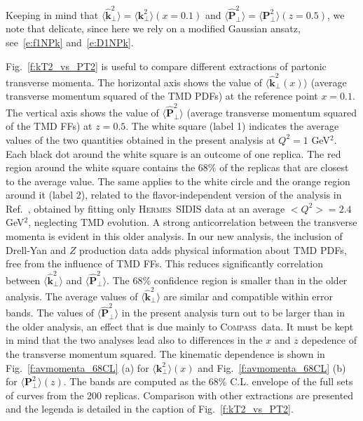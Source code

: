 \documentclass[aps,preprintnumbers,showpacs,nofootinbib,superscriptaddress,floatfix]{revtex4}
\newcommand{\hermes}{\textsc{Hermes}}
\newcommand{\compass}{\textsc{Compass}}
\newcommand{\T}{\perp}
\begin{document}
Keeping in mind that $\big \langle \hat{\bm{k}}_{\T}^2 \big \rangle = \big
\langle \bm{k}_{\T}^2 \big \rangle (x=0.1)$ and  $\big \langle
\hat{\bm{P}}_{\perp}^2 \big \rangle = \big \langle \bm{P}_{\perp}^2 \big
\rangle (z=0.5)$, we note that 
delicate, since here we rely on a modified Gaussian ansatz,
see~\eqref{e:f1NPk} and~\eqref{e:D1NPk}.

Fig.~\ref{f:kT2_vs_PT2} is useful to compare different extractions of
partonic transverse momenta. The horizontal axis shows 
the value of $\big \langle \hat{\bm{k}}_{\T}^2 (x)\big \rangle$ (average transverse
momentum squared of the TMD PDFs) at the reference point 
$x=0.1$. 
The vertical
axis shows the value of $\big \langle
\hat{\bm{P}}_{\perp}^2 \big \rangle$ (average transverse momentum squared of
the TMD FFs) at $z=0.5$. 
The white square (label 1) indicates the average values of the two quantities
obtained in the present analysis at $Q^2=1$ GeV$^2$.
Each black dot around the white square is an outcome of one replica. The red
region around the white square contains the $68\%$ of the replicas that are closest to the average value.
The same applies to the white circle and the orange region around it (label 2),
related to the flavor-independent version of the analysis in
Ref.~\cite{Signori:2013mda}, obtained by fitting only \hermes\ SIDIS
data at an average $<Q^2>= 2.4$ GeV$^2$, neglecting TMD evolution. 
A strong anticorrelation between the transverse momenta is evident in this
older analysis. 
In our new analysis, the inclusion of Drell-Yan and $Z$ production data adds physical information
about TMD PDFs, free from the influence of TMD FFs. This reduces significantly
correlation between $\big \langle \hat{\bm{k}}_{\T}^2 \big \rangle$ and $\big \langle \hat{\bm{P}}_{\perp}^2 \big \rangle$.  
The 68\% confidence region is smaller than in the older analysis. 
The average values of $\big \langle
\hat{\bm{k}}_{\T}^2 \big \rangle$ are similar and compatible within error
bands. 
The values of 
$\big \langle \hat{\bm{P}}_{\perp}^2 \big \rangle$ in the present analysis
turn out to be larger than
in the older analysis, an effect that is due mainly to \compass\ data.
It must be kept in mind that the two analyses lead also to differences in the $x$ and
$z$ depedence of the transverse momentum squared. 
The kinematic dependence is shown in Fig.~\ref{f:avmomenta_68CL} (a) for $\big
\langle \bm{k}_{\T}^2 \big \rangle (x)$ and Fig.~\ref{f:avmomenta_68CL} (b)
for $\big \langle \bm{P}_{\perp}^2 \big \rangle (z)$. 
The bands are computed as the $68\%$ C.L.  envelope of the full sets of curves from the 200 replicas. Comparison with other extractions are presented and the legenda is detailed in the caption of Fig.~\ref{f:kT2_vs_PT2}.
\end{document}
